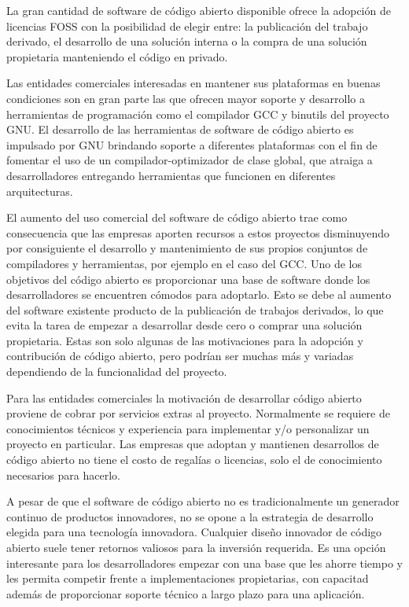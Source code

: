 La gran cantidad de software de código abierto disponible ofrece la
adopción de licencias FOSS con la posibilidad de elegir entre: la
publicación del trabajo derivado, el desarrollo de una solución
interna o la compra de una solución propietaria manteniendo el código
en privado.

Las entidades comerciales interesadas en mantener sus plataformas en
buenas condiciones son en gran parte las que ofrecen mayor soporte y
desarrollo a herramientas de programación como el compilador GCC y
binutils del proyecto GNU. El desarrollo de las herramientas de
software de código abierto es impulsado por GNU brindando soporte a
diferentes plataformas con el fin de fomentar el uso de un
compilador-optimizador de clase global, que atraiga a desarrolladores
entregando herramientas que funcionen en diferentes arquitecturas.

El aumento del uso comercial del software de código abierto trae como
consecuencia que las empresas aporten recursos a estos proyectos
disminuyendo por consiguiente el desarrollo y mantenimiento de sus
propios conjuntos de compiladores y herramientas, por ejemplo en el
caso del GCC. Uno de los objetivos del código abierto es proporcionar
una base de software donde los desarrolladores se encuentren cómodos
para adoptarlo. Esto se debe al aumento del software existente
producto de la publicación de trabajos derivados, lo que evita la
tarea de empezar a desarrollar desde cero o comprar una solución
propietaria. Estas son solo algunas de las motivaciones para la
adopción y contribución de código abierto, pero podrían ser muchas más
y variadas dependiendo de la funcionalidad del proyecto.

Para las entidades comerciales la motivación de desarrollar código
abierto proviene de cobrar por servicios extras al
proyecto. Normalmente se requiere de conocimientos técnicos y
experiencia para implementar y/o personalizar un proyecto en
particular. Las empresas que adoptan y mantienen desarrollos de código
abierto no tiene el costo de regalías o licencias, solo el de
conocimiento necesarios para hacerlo.

A pesar de que el software de código abierto no es tradicionalmente un
generador continuo de productos innovadores, no se opone a la
estrategia de desarrollo elegida para una tecnología
innovadora. Cualquier diseño innovador de código abierto suele tener
retornos valiosos para la inversión requerida. Es una opción
interesante para los desarrolladores empezar con una base que les
ahorre tiempo y les permita competir frente a implementaciones
propietarias, con capacitad además de proporcionar soporte técnico a
largo plazo para una aplicación.

